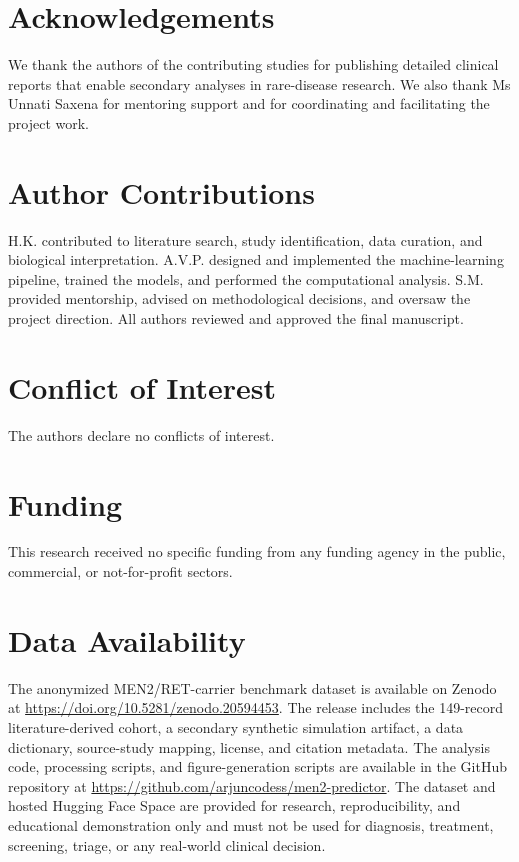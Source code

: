 \documentclass[12pt]{article}
\begin{document}
\section*{Acknowledgements}
We thank the authors of the contributing studies for publishing detailed clinical reports that enable secondary analyses in rare-disease research. We also thank Ms Unnati Saxena for mentoring support and for coordinating and facilitating the project work.

\section*{Author Contributions}
H.K. contributed to literature search, study identification, data curation, and biological interpretation. A.V.P. designed and implemented the machine-learning pipeline, trained the models, and performed the computational analysis. S.M. provided mentorship, advised on methodological decisions, and oversaw the project direction. All authors reviewed and approved the final manuscript.

\section*{Conflict of Interest}
The authors declare no conflicts of interest.

\section*{Funding}
This research received no specific funding from any funding agency in the public, commercial, or not-for-profit sectors.

\section*{Data Availability}
The anonymized MEN2/RET-carrier benchmark dataset is available on Zenodo at \url{https://doi.org/10.5281/zenodo.20594453}. The release includes the 149-record literature-derived cohort, a secondary synthetic simulation artifact, a data dictionary, source-study mapping, license, and citation metadata. The analysis code, processing scripts, and figure-generation scripts are available in the GitHub repository at \url{https://github.com/arjuncodess/men2-predictor}. The dataset and hosted Hugging Face Space are provided for research, reproducibility, and educational demonstration only and must not be used for diagnosis, treatment, screening, triage, or any real-world clinical decision.
\end{document}
